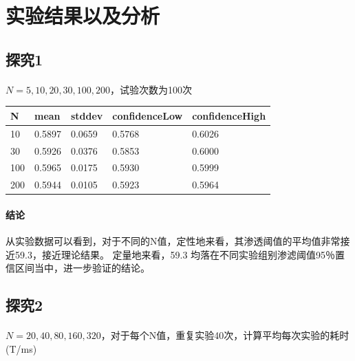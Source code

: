 \documentclass[12pt,a4paper]{ctexart}
\begin{document}
\section{实验结果以及分析}

\subsection{探究1}
\paragraph{}$N=5,10,20,30,100,200$，试验次数为100次 

\begin{table}[htbp]
    \centering
    \begin{tabular}{|l|l|l|l|l|}
    \hline
    N   & mean   & stddev & confidenceLow & confidenceHigh \\ \hline
    10  & 0.5897 & 0.0659 & 0.5768        & 0.6026         \\ \hline
    30  & 0.5926 & 0.0376 & 0.5853        & 0.6000         \\ \hline
    100 & 0.5965 & 0.0175 & 0.5930        & 0.5999         \\ \hline
    200 & 0.5944 & 0.0105 & 0.5923        & 0.5964         \\ \hline
    \end{tabular}
    \end{table}
\paragraph{结论}从实验数据可以看到，对于不同的N值，定性地来看，其渗透阈值的平均值非常接近59.3，接近理论结果。
定量地来看，59.3 均落在不同实验组别渗滤阈值95％置信区间当中，进一步验证的结论。

\subsection{探究2}
\paragraph{}$N=20,40,80,160,320$，对于每个N值，重复实验40次，计算平均每次实验的耗时(T/ms)
\end{document}
